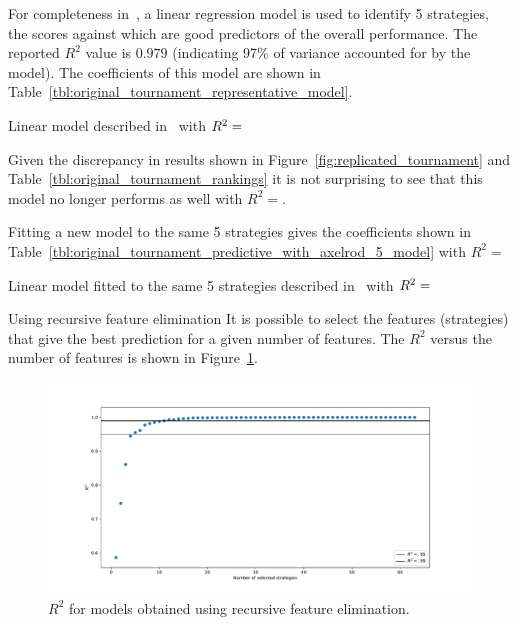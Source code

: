 \documentclass{article}
\begin{document}
For completeness in~\cite{Axelrod1980b}, a linear regression model is used to
identify 5 strategies, the scores against which are good predictors of the
overall performance. The reported \(R^2\) value is \(0.979\) (indicating 97\% of
variance accounted for by the model). The coefficients of this model are shown
in Table~\ref{tbl:original_tournament_representative_model}.

\begin{table}[!hbtp]
        \centering
        
        \caption{Linear model described in~\cite{Axelrod1980b} with
             \(R^2=\protect\)}
        \label{tbl:original_tournament_representative_model}
\end{table}

Given the discrepancy in results shown in
Figure~\ref{fig:replicated_tournament} and
Table~\ref{tbl:original_tournament_rankings} it is not surprising to see that
this model no longer performs as well with
\(R^2=\).

Fitting a new model to the same 5 strategies gives the coefficients shown in
Table~\ref{tbl:original_tournament_predictive_with_axelrod_5_model} with
\(R^2=\)

\begin{table}[!hbtp]
        \centering
        
        \caption{Linear model fitted to the same 5 strategies described
                 in~\cite{Axelrod1980b} with
             \(R^2=\protect\)}
        \label{tbl:original_tournament_predictive_with_axelrod_5_model}
\end{table}

Using recursive feature elimination
It is possible to select the features (strategies) that give the best prediction
for a given number of features. The \(R^2\) versus the number of features is
shown in
Figure~\ref{fig:original_tournament_r_squared_versus_number_of_features}.

\begin{figure}[!hbtp]
    \centering
    \includegraphics[width=.8\textwidth]{assets/original_tournament_r_squared_versus_number_of_features.pdf}
    \caption{\(R^2\) for models obtained using recursive feature elimination.}
    \label{fig:original_tournament_r_squared_versus_number_of_features}
\end{figure}
\end{document}
